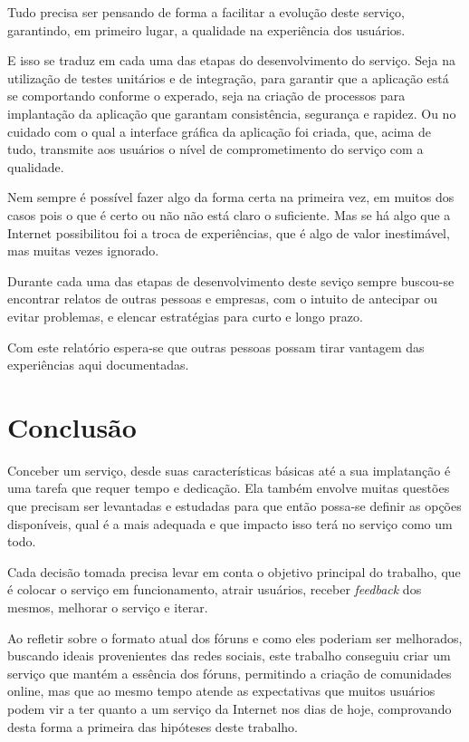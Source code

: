 \documentclass[diss]{template/setrem}
\begin{document}
Tudo precisa ser pensando de forma a facilitar a evolução deste serviço, garantindo, em primeiro lugar, a qualidade na experiência dos usuários.

E isso se traduz em cada uma das etapas do desenvolvimento do serviço. Seja na utilização de testes unitários e de integração, para garantir que a aplicação está se comportando conforme o experado, seja na criação de processos para implantação da aplicação que garantam consistência, segurança e rapidez. Ou no cuidado com o qual a interface gráfica da aplicação foi criada, que, acima de tudo, transmite aos usuários o nível de comprometimento do serviço com a qualidade.

Nem sempre é possível fazer algo da forma certa na primeira vez, em muitos dos casos pois o que é certo ou não não está claro o suficiente. Mas se há algo que a Internet possibilitou foi a troca de experiências, que é algo de valor inestimável, mas muitas vezes ignorado.

Durante cada uma das etapas de desenvolvimento deste seviço sempre buscou-se encontrar relatos de outras pessoas e empresas, com o intuito de antecipar ou evitar problemas, e elencar estratégias para curto e longo prazo.

Com este relatório espera-se que outras pessoas possam tirar vantagem das experiências aqui documentadas.


\chapter*{Conclusão}
Conceber um serviço, desde suas características básicas até a sua implatanção é uma tarefa que requer tempo e dedicação. Ela também envolve muitas questões que precisam ser levantadas e estudadas para que então possa-se definir as opções disponíveis, qual é a mais adequada e que impacto isso terá no serviço como um todo.

Cada decisão tomada precisa levar em conta o objetivo principal do trabalho, que é colocar o serviço em funcionamento, atrair usuários, receber \emph{feedback} dos mesmos, melhorar o serviço e iterar.

Ao refletir sobre o formato atual dos fóruns e como eles poderiam ser melhorados, buscando ideais provenientes das redes sociais, este trabalho conseguiu criar um serviço que mantém a essência dos fóruns, permitindo a criação de comunidades online, mas que ao mesmo tempo atende as expectativas que muitos usuários podem vir a ter quanto a um serviço da Internet nos dias de hoje, comprovando desta forma a primeira das hipóteses deste trabalho.
\end{document}
